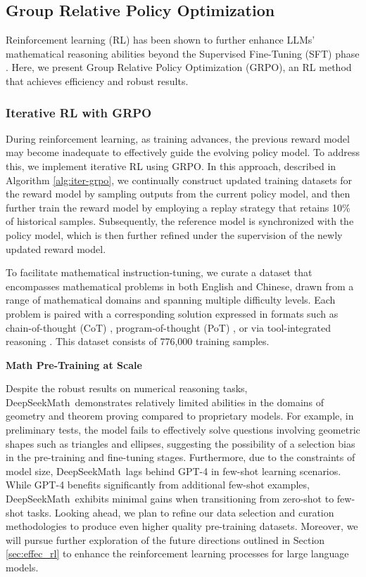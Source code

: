 \subsection{Group Relative Policy Optimization}
Reinforcement learning (RL) has been shown to further enhance LLMs' mathematical reasoning abilities beyond the Supervised Fine-Tuning (SFT) phase \citep{wang2023math,wizardmath}. Here, we present Group Relative Policy Optimization (GRPO), an RL method that achieves efficiency and robust results.

\subsubsection{Iterative RL with GRPO} During reinforcement learning, as training advances, the previous reward model may become inadequate to effectively guide the evolving policy model. To address this, we implement iterative RL using GRPO. In this approach, described in Algorithm \ref{alg:iter-grpo}, we continually construct updated training datasets for the reward model by sampling outputs from the current policy model, and then further train the reward model by employing a replay strategy that retains 10\% of historical samples. Subsequently, the reference model is synchronized with the policy model, which is then further refined under the supervision of the newly updated reward model.

To facilitate mathematical instruction-tuning, we curate a dataset that encompasses mathematical problems in both English and Chinese, drawn from a range of mathematical domains and spanning multiple difficulty levels. Each problem is paired with a corresponding solution expressed in formats such as chain-of-thought (CoT) \citep{cot}, program-of-thought (PoT) \citep{pot,pal}, or via tool-integrated reasoning \citep{tora}. This dataset consists of 776,000 training samples.

\textbf{Math Pre-Training at Scale}

Despite the robust results on numerical reasoning tasks, DeepSeekMath~demonstrates relatively limited abilities in the domains of geometry and theorem proving compared to proprietary models. For example, in preliminary tests, the model fails to effectively solve questions involving geometric shapes such as triangles and ellipses, suggesting the possibility of a selection bias in the pre-training and fine-tuning stages. Furthermore, due to the constraints of model size, DeepSeekMath~lags behind GPT-4 in few-shot learning scenarios. While GPT-4 benefits significantly from additional few-shot examples, DeepSeekMath~exhibits minimal gains when transitioning from zero-shot to few-shot tasks. Looking ahead, we plan to refine our data selection and curation methodologies to produce even higher quality pre-training datasets. Moreover, we will pursue further exploration of the future directions outlined in Section \ref{sec:effec_rl} to enhance the reinforcement learning processes for large language models.

